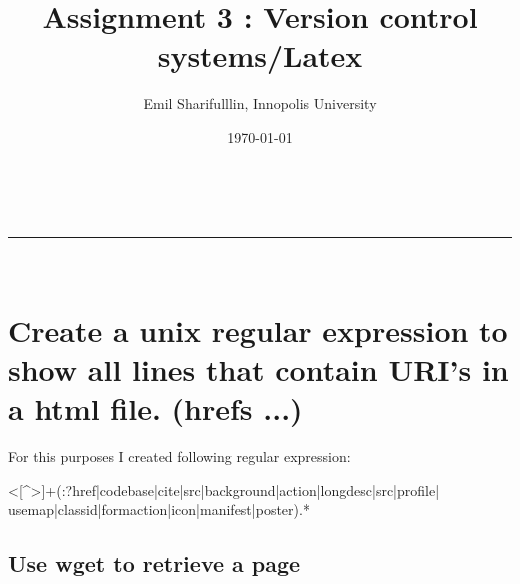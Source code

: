 \documentclass[a4paper,11pt]{article}
\makeatletter
\newcommand*{\TitleFont}{%
      \usefont{\encodingdefault}{\rmdefault}{b}{n}%
      \fontsize{16}{20}%
      \selectfont}
\renewcommand{\maketitle}{
\begin{center}
\vspace{2ex}
{\huge \textsc{\@title}}
\vspace{1ex}
\\
\rule{\linewidth}{0.5pt}\\
\@author \hfill \@date
\vspace{4ex}
\end{center}
}
\makeatother
\begin{document}







\title{ \TitleFont Assignment 3 : Version control systems/Latex }

\author{Emil Sharifulllin, Innopolis University}

\date{\today}

\maketitle

\section{Create a unix regular expression to show all lines that contain
URI’s in a html file. (hrefs ...)}

For this purposes I created following regular expression: \\



\begin{bashcode}
<[^>]+(:?href|codebase|cite|src|background|action|longdesc|src|profile| usemap|classid|formaction|icon|manifest|poster).* 
\end{bashcode}



\subsection{Use wget to retrieve a page}
\end{document}
